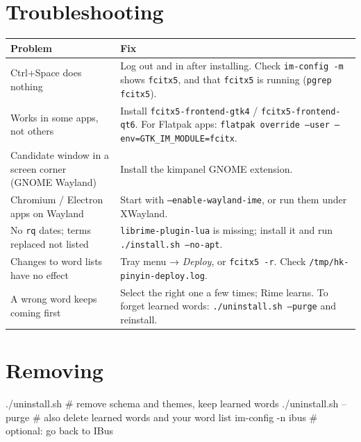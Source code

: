 \documentclass[11pt,a4paper]{article}
\newcommand{\code}[1]{\texttt{#1}}
\newenvironment{codeblock}{\begin{tcolorbox}[codebox]}{\end{tcolorbox}}
\begin{document}
\section{Troubleshooting}
\renewcommand{\arraystretch}{1.3}
\begin{tabularx}{\linewidth}{@{}>{\raggedright\arraybackslash}p{4.6cm}>{\raggedright\arraybackslash}X@{}}
\toprule
\textbf{Problem} & \textbf{Fix} \\
\midrule
Ctrl+Space does nothing & Log out and in after installing. Check \code{im-config -m} shows \code{fcitx5}, and that \code{fcitx5} is running (\code{pgrep fcitx5}). \\
Works in some apps, not others & Install \code{fcitx5-frontend-gtk4} / \code{fcitx5-frontend-qt6}. For Flatpak apps: \code{flatpak override --user --env=GTK\_IM\_MODULE=fcitx}. \\
Candidate window in a screen corner (GNOME Wayland) & Install the kimpanel GNOME extension. \\
Chromium / Electron apps on Wayland & Start with \code{--enable-wayland-ime}, or run them under XWayland. \\
No \code{rq} dates; terms replaced not listed & \code{librime-plugin-lua} is missing; install it and run \code{./install.sh --no-apt}. \\
Changes to word lists have no effect & Tray menu → \emph{Deploy}, or \code{fcitx5 -r}. Check \code{/tmp/hk-pinyin-deploy.log}. \\
A wrong word keeps coming first & Select the right one a few times; Rime learns. To forget learned words: \code{./uninstall.sh --purge} and reinstall. \\
\bottomrule
\end{tabularx}

\section{Removing}
\begin{codeblock}
\begin{shell}
./uninstall.sh          # remove schema and themes, keep learned words
./uninstall.sh --purge  # also delete learned words and your word list
im-config -n ibus       # optional: go back to IBus
\end{shell}
\end{codeblock}

\end{document}
